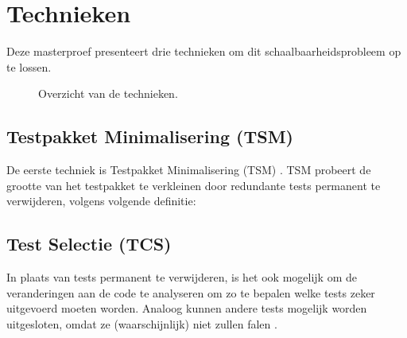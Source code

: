 \section{Technieken}
\noindent Deze masterproef presenteert drie technieken om dit schaalbaarheidsprobleem op te lossen.

\begin{figure*}[t]
	\centering
	\hfill
	\hfill
	\caption{Overzicht van de technieken.}
\end{figure*}

\subsection{Testpakket Minimalisering (TSM)}
\noindent De eerste techniek is Testpakket Minimalisering (TSM) \cite{10.1002/stv.430}. TSM probeert de grootte van het testpakket te verkleinen door redundante tests permanent te verwijderen, volgens volgende definitie:\\

\noindent{}

\subsection{Test Selectie (TCS)}
\noindent In plaats van tests permanent te verwijderen, is het ook mogelijk om de veranderingen aan de code te analyseren om zo te bepalen welke tests zeker uitgevoerd moeten worden. Analoog kunnen andere tests mogelijk worden uitgesloten, omdat ze (waarschijnlijk) niet zullen falen \cite{10.1002/stv.430}.\\

